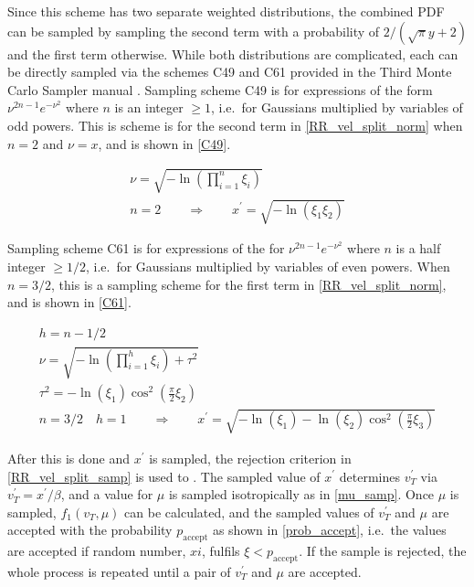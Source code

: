 Since this scheme has two separate weighted distributions, the combined PDF can be sampled by sampling the second term with a probability of $2/(\sqrt{\pi}y+2)$ and the first term otherwise. %
  While both distributions are complicated, each can be directly sampled via the schemes C49 and C61 provided in the Third Monte Carlo Sampler manual \cite{3rdsampler}.  Sampling scheme C49 is for expressions of the form $\nu^{2n-1}e^{-\nu^2}$ where $n$ is an integer $\ge 1$, i.e.\ for Gaussians multiplied by variables of odd powers.  This is scheme is for the second term in \eqref{RR_vel_split_norm} when $n=2$ and $\nu=x$, and is shown in \eqref{C49}.

\begin{equation}
\label{C49}
\begin{gathered}
\nu = \sqrt{- \ln \left( \prod_{i=1}^n \xi_i \right)} \\ 
n = 2 \qquad \Rightarrow \qquad x^\prime = \sqrt{- \ln \left( \xi_1 \xi_2 \right)}
\end{gathered}
\end{equation}

Sampling scheme C61 is for expressions of the for $\nu^{2n-1}e^{-\nu^2}$ where $n$ is a half integer $\ge 1/2$, i.e.\ for Gaussians multiplied by variables of even powers.  When $n=3/2$, this is a sampling scheme for the first term in \eqref{RR_vel_split_norm}, and is shown in \eqref{C61}.

\begin{equation}
\label{C61}
\begin{gathered}
h = n-1/2 \\
\nu = \sqrt{- \ln \left( \prod_{i=1}^h \xi_i  \right)+ \tau^2} \\ 
\tau^2 = -\ln(\xi_1) \cos^2(\frac{\pi}{2}\xi_2)\\
n = 3/2 \quad h=1 \qquad \Rightarrow \qquad x^\prime =   \sqrt{- \ln( \xi_1) - \ln(\xi_2) \cos^2(\frac{\pi}{2}\xi_3)}
\end{gathered}
\end{equation}

After this %
 is done and $x^\prime$ is sampled, the rejection criterion in \eqref{RR_vel_split_samp} is used to%
.  The sampled value of $x^\prime$ determines $v_T^\prime$ via $v_T^\prime=x^\prime/\beta$, and a value for $\mu$ is sampled isotropically as in \eqref{mu_samp}.  Once $\mu$ is sampled, $f_1(v_T,\mu)$ can be calculated, and the sampled values of $v_T^\prime$ and $\mu$ are accepted with the probability $p_\mathrm{accept}$ as shown in \eqref{prob_accept}, i.e.\ the values are accepted if random number, $xi$, fulfils $\xi<p_\mathrm{accept}$.  If the sample is rejected, the whole process is repeated until a pair of $v_T^\prime$ and $\mu$ are accepted.  

